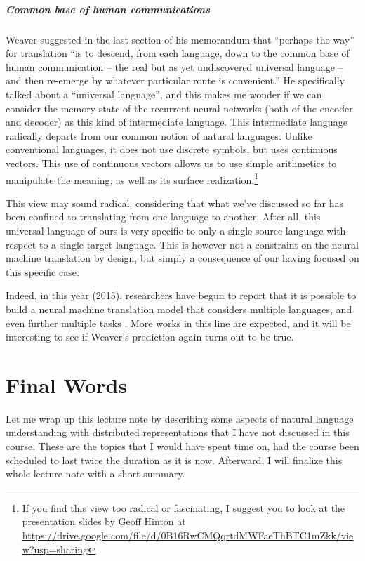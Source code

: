 \documentclass{report}
\begin{document}
\paragraph{Common base of human communications}

Weaver suggested in the last section of his memorandum that ``perhaps the way''
for translation ``is to descend, from each language, down to the common base of
human communication -- the real but as yet undiscovered universal language --
and then re-emerge by whatever particular route is convenient.'' He specifically
talked about a ``universal language'', and this makes me wonder if we can
consider the memory state of the recurrent neural networks (both of the encoder
and decoder) as this kind of intermediate language. This intermediate language
radically departs from our common notion of natural languages. Unlike
conventional languages, it does not use discrete symbols, but uses continuous
vectors. This use of continuous vectors allows us to use simple arithmetics to
manipulate the meaning, as well as its surface realization.\footnote{
    If you find this view too radical or fascinating, I suggest you to look at
    the presentation slides by Geoff Hinton at
    \url{https://drive.google.com/file/d/0B16RwCMQqrtdMWFaeThBTC1mZkk/view?usp=sharing}
}

This view may sound radical, considering that what we've discussed so far has
been confined to translating from one language to another. After all, this
universal language of ours is very specific to only a single source language
with respect to a single target language. This is however not a constraint on
the neural machine translation by design, but simply a consequence of our having
focused on this specific case. 

Indeed, in this year (2015), researchers have begun to report that it is
possible to build a neural machine translation model that considers multiple
languages, and even further multiple tasks \cite{dong2015multi,luong2015}. More
works in this line are expected, and it will be interesting to see if Weaver's
prediction again turns out to be true.


\chapter{Final Words}

Let me wrap up this lecture note by describing some aspects of natural language
understanding with distributed representations that I have not discussed in this
course. These are the topics that I would have spent time on, had the course
been scheduled to last twice the duration as it is now. Afterward, I will
finalize this whole lecture note with a short summary.
\end{document}
